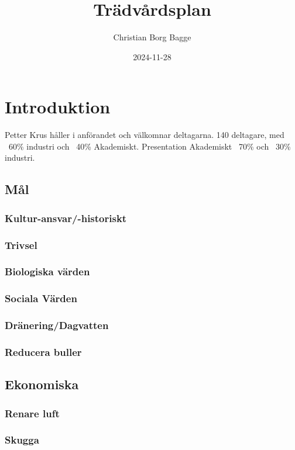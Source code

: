 \documentclass[12pt,a4paper]{article}
\author{Christian Borg Bagge}
\title{Trädvårdsplan}
\date{2024-11-28}
\begin{document}
\maketitle

\section{Introduktion} 
\label{sec:introduktion}

Petter Krus håller i anförandet och välkomnar deltagarna.
140 deltagare, med ~60\% industri och ~40\% Akademiskt. 
Presentation Akademiskt ~70\% och ~30\% industri.


\subsection{Mål}

\subsubsection{Kultur-ansvar/-historiskt}

\subsubsection{Trivsel}
\subsubsection{Biologiska värden}
\subsubsection{Sociala Värden}
\subsubsection{Dränering/Dagvatten}
\subsubsection{Reducera buller}


\subsection{Ekonomiska}
\subsubsection{Renare luft}
\subsubsection{Skugga}
\end{document}

